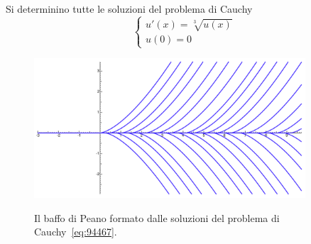 \begin{example}
Si determinino tutte le soluzioni del problema di Cauchy
\begin{equation}
\label{eq:94467}
\begin{cases}
  u'(x) = \sqrt[3]{u(x)}\\
  u(0)=0
\end{cases}
\end{equation}
\end{example}
%
\newsavebox{\qrnovequattro}
\begin{figure}
\centering
\includegraphics[width=0.9\textwidth]{fig_94467.pdf}
\label{fig:94467}
\caption{Il baffo di Peano formato dalle soluzioni del problema di Cauchy~\eqref{eq:94467}.\\\\
\usebox{\qrnovequattro}}
\end{figure}
%

